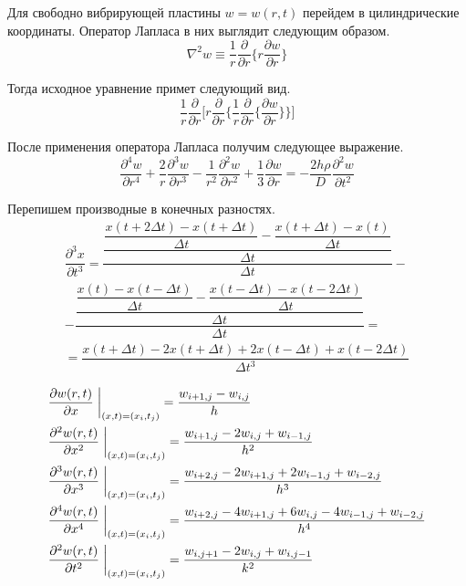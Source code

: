 Для свободно вибрирующей пластины $w=w(r,t)$ перейдем в цилиндрические координаты. Оператор Лапласа в них выглядит следующим образом.
\begin{equation}
  \nabla^2 w\equiv \dfrac{1}{r}\dfrac{\partial}{\partial r}\bigg\{r\dfrac{\partial w}{\partial r}\bigg\}
\end{equation}

Тогда исходное уравнение примет следующий вид.
\begin{equation}
  \dfrac{1}{r}\dfrac{\partial}{\partial r}\bigg[r\dfrac{\partial }{\partial r}\bigg\{\dfrac{1}{r}\dfrac{\partial}{\partial r}\bigg\{\dfrac{\partial w}{\partial r}\bigg\}\bigg\}\bigg]
\end{equation}

После применения оператора Лапласа получим следующее выражение.
\begin{equation}
\dfrac{\partial^4 w}{\partial r^4}+\dfrac{2}{r}\dfrac{\partial^3 w}{\partial r^3}-\dfrac{1}{r^2}\dfrac{\partial^2 w}{\partial r^2}+\dfrac{1}
{3}\dfrac{\partial w}{\partial r}=-\dfrac{2h\rho}{D}\dfrac{\partial^2 w}{\partial t^2}
\end{equation}

Перепишем производные в конечных разностях.
\begin{equation}
\begin{split}
  \dfrac{\partial^3 x}{\partial t^3}=\dfrac{\dfrac{\dfrac{x(t+2\Delta t)-x(t+\Delta t)}{\Delta t}-\dfrac{x(t+\Delta t)-x(t)}{\Delta t}}{\Delta t}}{\Delta t}-\\
  -\dfrac{\dfrac{\dfrac{x(t)-x(t-\Delta t)}{\Delta t}-\dfrac{x(t-\Delta t)-x(t-2\Delta t)}{\Delta t}}{\Delta t}}{\Delta t}=\\
  =\dfrac{x(t+\Delta t)-2x(t+\Delta t)+2x(t-\Delta t)+x(t-2\Delta t)}{\Delta t^3}
\end{split}
\end{equation}

\begin{align}
  &\dfrac{\partial w(r,t)}{\partial x}\;\bigg|_{(x,t)=(x_i,t_j)}=\dfrac{w_{i+1,j}-w_{i,j}}{h}\notag\\
  &\dfrac{\partial^2 w(r,t)}{\partial x^2}\;\bigg|_{(x,t)=(x_i,t_j)}=\dfrac{w_{i+1,j}-2w_{i,j}+w_{i-1,j}}{h^2}\notag\\
  &\dfrac{\partial^3 w(r,t)}{\partial x^3}\;\bigg|_{(x,t)=(x_i,t_j)}=\dfrac{w_{i+2,j}-2w_{i+1,j}+2w_{i-1,j}+w_{i-2,j}}{h^3}\\
  &\dfrac{\partial^4 w(r,t)}{\partial x^4}\;\bigg|_{(x,t)=(x_i,t_j)}=\dfrac{w_{i+2,j}-4w_{i+1,j}+6w_{i,j}-4w_{i-1,j}+w_{i-2,j}}{h^4}\notag\\
  &\dfrac{\partial^2 w(r,t)}{\partial t^2}\;\bigg|_{(x,t)=(x_i,t_j)}=\dfrac{w_{i,j+1}-2w_{i,j}+w_{i,j-1}}{k^2}\notag
\end{align}

